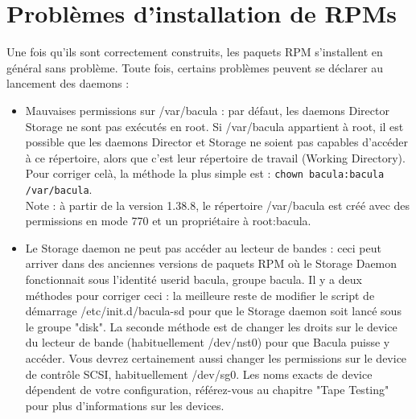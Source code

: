 \section{Problèmes d'installation de RPMs}
Une fois qu'ils sont correctement construits, les paquets RPM s'installent en
général sans problème. Toute fois, certains problèmes peuvent se déclarer au
lancement des daemons :
\begin{itemize}
\item Mauvaises permissions sur /var/bacula : par défaut, les daemons Director 
    Storage ne sont pas exécutés en root. Si /var/bacula appartient à root, il
    est possible que les daemons Director et Storage ne soient pas capables 
    d'accéder à ce répertoire, alors que c'est leur répertoire de travail 
    (Working Directory). Pour corriger celà, la méthode la plus simple est :
    \verb+chown bacula:bacula /var/bacula+.\\
  Note : à partir de la version 1.38.8, le répertoire /var/bacula est créé avec
  des permissions en mode 770 et un propriétaire à root:bacula.
\item Le Storage daemon ne peut pas accéder au lecteur de bandes : ceci peut 
    arriver dans des anciennes versions de paquets RPM où le Storage Daemon
    fonctionnait sous l'identité userid bacula, groupe bacula. Il y a deux
    méthodes pour corriger ceci : la meilleure reste de modifier le script de
    démarrage /etc/init.d/bacula-sd pour que le Storage daemon soit lancé sous
    le groupe "disk". La seconde méthode est de changer les droits sur le 
    device du lecteur de bande (habituellement /dev/nst0) pour que Bacula puisse
    y accéder. Vous devrez certainement aussi changer les permissions sur le
    device de contrôle SCSI, habituellement /dev/sg0. Les noms exacts de device
    dépendent de votre configuration, référez-vous au chapitre "Tape Testing"
    pour plus d'informations sur les devices.
\end{itemize}
 
